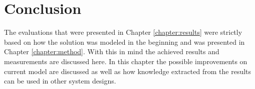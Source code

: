 \chapter{Conclusion}
\label{chapter:conclusion}
The  evaluations that were presented in Chapter \ref{chapter:results} were strictly based on how the solution was modeled in the beginning and was presented in Chapter \ref{chapter:method}. With this in mind the achieved results and measurements are discussed here. In this chapter the possible improvements on current model are discussed as well as how knowledge extracted from the results can be used in other system designs.



